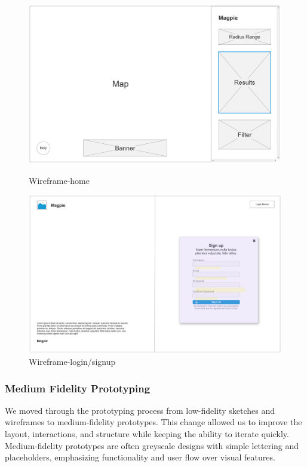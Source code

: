 \begin{figure}[htbp]
    \centering
    \begin{minipage}{0.48\textwidth}
        \centering
        \includegraphics[width=\textwidth]{images/wireframe-home.jpg}
        \caption{Wireframe-home}
        \label{fig:wireframe-home}
    \end{minipage}
    \hfill
    \begin{minipage}{0.48\textwidth}
        \centering
        \includegraphics[width=\textwidth]{images/wireframe-signup.jpg}
        \caption{Wireframe-login/signup}
        \label{fig:wireframe-signup}
    \end{minipage}
\end{figure}

\newpage{}

\subsubsection{Medium Fidelity Prototyping}
We moved through the prototyping process from low-fidelity sketches and
wireframes to medium-fidelity prototypes. This change allowed us to improve the
layout, interactions, and structure while keeping the ability to iterate
quickly. Medium-fidelity prototypes are often greyscale designs with simple
lettering and placeholders, emphasizing functionality and user flow over visual
features.


